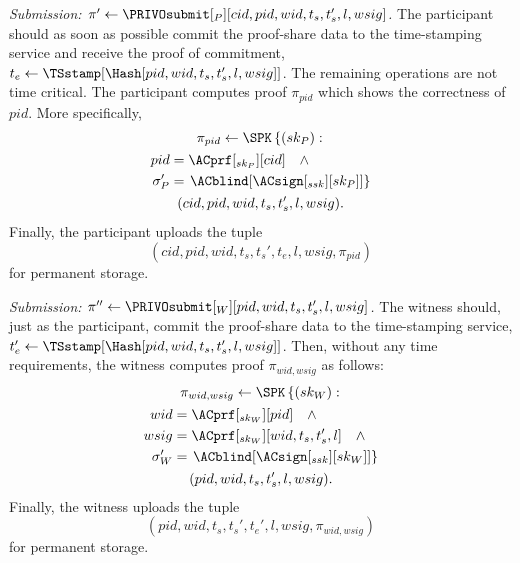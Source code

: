 
\emph{Submission: \(\pi'\gets \PRIVOsubmit[_P][cid, pid, wid, t_s, t_s', l, 
    wsig]\).}
The participant should as soon as possible commit the proof-share data to the 
time-stamping service and receive the proof of commitment, \(t_e\gets 
  \TSstamp[\Hash[pid, wid, t_s, t_s', l, wsig]]\).
The remaining operations are not time critical.
The participant computes  proof \(\pi_{pid}\) which shows the 
correctness of \(pid\).
More specifically,
\begin{multline*}
  \pi_{pid}\gets \SPK\left\{ (sk_P) : \right. \\
    \begin{aligned}
      pid &= \ACprf[_{sk_P}][cid] \quad \land \\
      \sigma_P' &= \left. \ACblind[\ACsign[_{ssk}][sk_P]] \right\}
    \end{aligned} \\
      (cid, pid, wid, t_s, t_s', l, wsig).
\end{multline*}
Finally, the participant uploads the tuple \[
  (cid, pid, wid, t_s, t_s', t_e, l, wsig, \pi_{pid})
\] for permanent storage.

\emph{Submission: \(\pi''\gets \PRIVOsubmit[_W][pid, wid, t_s, t_s', l, 
    wsig]\).}
The witness should, just as the participant, commit the proof-share data to the 
time-stamping service, \(t_e'\gets \TSstamp[\Hash[pid, wid, t_s, t_s', l, 
  wsig]]\).
Then, without any time requirements, the witness computes  proof 
\(\pi_{wid, wsig}\) as follows:
\begin{multline*}
  \pi_{wid, wsig}\gets \SPK\left\{ (sk_W) : \right. \\
    \begin{aligned}
      wid &= \ACprf[_{sk_W}][pid] \quad \land \\
      wsig &= \ACprf[_{sk_W}][wid, t_s, t_s', l] \quad \land \\
      \sigma_W' &= \left. \ACblind[\ACsign[_{ssk}][sk_W]] \right\}
    \end{aligned} \\
      (pid, wid, t_s, t_s', l, wsig).
\end{multline*}
Finally, the witness uploads the tuple \[
  (pid, wid, t_s, t_s', t_e', l, wsig, \pi_{wid, wsig})
\] for permanent storage.


